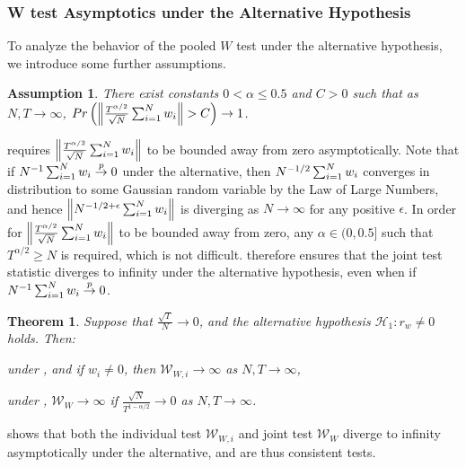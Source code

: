 \documentclass[12pt]{article}
\newtheorem{theorem}{Theorem}[section]
\newtheorem{assump}{Assumption}
\theoremstyle{plain}
\numberwithin{equation}{section}
\begin{document}
\subsubsection{W test Asymptotics under the Alternative Hypothesis}
To analyze the behavior of the pooled $W$ test under the alternative hypothesis, we introduce some further assumptions.
\begin{assump}
\label{ass:18:W_test_alter_assump}
There exist constants $0 < \alpha \leq 0.5$ and $C > 0$ such that as $N, T \to \infty$,
$ 
Pr\left( \norm{\frac{T^{\alpha/2}}{\sqrt{N}} \sum_{i = 1}^{N} w_i} > C\right) \to 1
$.
\end{assump}
 requires $\norm{\frac{T^{\alpha/2}}{\sqrt{N}} \sum_{i = 1}^{N} w_i}$ to be bounded away from zero asymptotically. Note that if $N^{-1} \sum_{i = 1}^{N} w_i \overset{p}{\to} 0$ under the alternative, then $N^{-1/2} \sum_{i = 1}^{N} w_i$ converges in distribution to some Gaussian random variable by the Law of Large Numbers, and hence $\norm{N^{-1/2 + \epsilon} \sum_{i = 1}^{N} w_i}$ is diverging as $N \to \infty$ for any positive $\epsilon$. In order for $\norm{\frac{T^{\alpha/2}}{\sqrt{N}} \sum_{i = 1}^{N} w_i}$ to be bounded away from zero, any $\alpha \in (0, 0.5]$ such that $T^{\alpha/2} \geq N$ is required, which is not difficult.  therefore ensures that the joint test statistic diverges to infinity under the alternative hypothesis, even when if $N^{-1} \sum_{i = 1}^{N} w_i \overset{p}{\to} 0$. 
\begin{theorem}
\label{thm:11:W_test_alter_cons}
Suppose that $\frac{\sqrt{T}}{N} \to 0$, and the alternative hypothesis $\mathcal{H}_1: r_w \neq 0$ holds. Then:
\begin{thmenum}
\item \label{thm:11:W_test_alter_cons:1} 
under , and if $w_i \neq 0$, then $\mathscr{W}_{W, i} \to \infty$ as $N, T \to \infty$,
\item \label{thm:11:W_test_alter_cons:2}
under , $\mathscr{W}_{W} \to \infty$ if $\frac{\sqrt{N}}{T^{1 - \alpha/2}} \to 0$ as $N, T \to \infty$.
\end{thmenum}
\end{theorem}
 shows that both the individual test $\mathscr{W}_{W, i}$ and joint test $\mathscr{W}_{W}$ diverge to infinity asymptotically under the alternative, and are thus consistent tests. 
\end{document}
